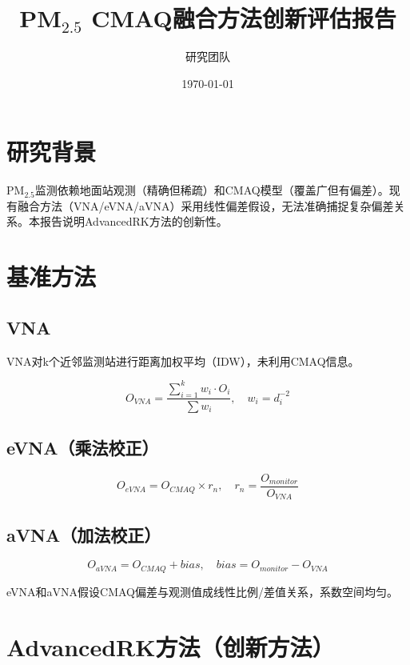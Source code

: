 \documentclass[UTF8, a4paper, 12pt]{article}
\title{PM$_{2.5}$ CMAQ融合方法创新评估报告}
\author{研究团队}
\date{\today}
\begin{document}
\maketitle

\section{研究背景}

PM$_{2.5}$监测依赖地面站观测（精确但稀疏）和CMAQ模型（覆盖广但有偏差）。现有融合方法（VNA/eVNA/aVNA）采用线性偏差假设，无法准确捕捉复杂偏差关系。本报告说明AdvancedRK方法的创新性。

\section{基准方法}

\subsection{VNA}

VNA对k个近邻监测站进行距离加权平均（IDW），未利用CMAQ信息。

\begin{equation}
O_{VNA} = \frac{\sum_{i=1}^{k} w_i \cdot O_i}{\sum w_i}, \quad w_i = d_i^{-2}
\end{equation}

\subsection{eVNA（乘法校正）}

\begin{equation}
O_{eVNA} = O_{CMAQ} \times r_n, \quad r_n = \frac{O_{monitor}}{O_{VNA}}
\end{equation}

\subsection{aVNA（加法校正）}

\begin{equation}
O_{aVNA} = O_{CMAQ} + bias, \quad bias = O_{monitor} - O_{VNA}
\end{equation}

eVNA和aVNA假设CMAQ偏差与观测值成线性比例/差值关系，系数空间均匀。

\section{AdvancedRK方法（创新方法）}
\end{document}
